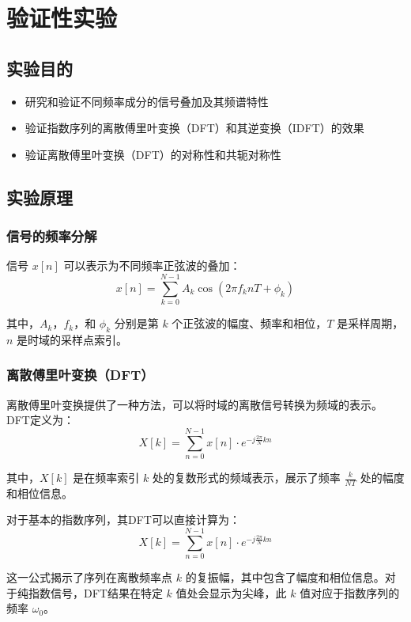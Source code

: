 \documentclass[a4paper,12pt]{article}
\begin{document}
\section{验证性实验}
\subsection{实验目的}
\begin{itemize}
    \item 研究和验证不同频率成分的信号叠加及其频谱特性
    \item 验证指数序列的离散傅里叶变换（DFT）和其逆变换（IDFT）的效果
    \item 验证离散傅里叶变换（DFT）的对称性和共轭对称性
\cite{ning2012}
    
\end{itemize}


\subsection{实验原理}
\subsubsection{信号的频率分解}
信号 \( x[n] \) 可以表示为不同频率正弦波的叠加：
\begin{equation}
x[n] = \sum_{k=0}^{N-1} A_k \cos(2\pi f_k nT + \phi_k) 
\end{equation}

其中，\( A_k \)，\( f_k \)，和 \( \phi_k \) 分别是第 \( k \) 个正弦波的幅度、频率和相位，\( T \) 是采样周期，\( n \) 是时域的采样点索引。

\subsubsection{离散傅里叶变换（DFT）}
离散傅里叶变换提供了一种方法，可以将时域的离散信号转换为频域的表示。DFT定义为：
\begin{equation}
X[k] = \sum_{n=0}^{N-1} x[n] \cdot e^{-j\frac{2\pi}{N}kn}
\end{equation}

其中，\( X[k] \) 是在频率索引 \( k \) 处的复数形式的频域表示，展示了频率 \( \frac{k}{NT} \) 处的幅度和相位信息。

对于基本的指数序列，其DFT可以直接计算为：
\begin{equation}
X[k] = \sum_{n=0}^{N-1} x[n] \cdot e^{-j\frac{2\pi}{N}kn}
\end{equation}

这一公式揭示了序列在离散频率点 \( k \) 的复振幅，其中包含了幅度和相位信息。对于纯指数信号，DFT结果在特定 \( k \) 值处会显示为尖峰，此 \( k \) 值对应于指数序列的频率 \( \omega_0 \)。
\end{document}
